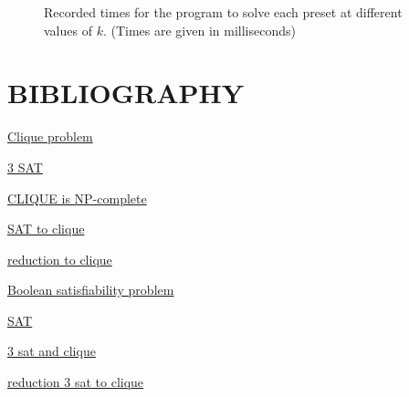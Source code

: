 \documentclass[table]{article}
\begin{document}
\begin{figure}[h]
\begin{subfigure}{0.49\linewidth}
    \end{subfigure}
    \caption{Recorded times for the program to solve each preset at different values of $k$. (Times are given in milliseconds)}
\end{figure}

\newpage\section{BIBLIOGRAPHY}

\leftskip=1.2in
\href{https://en.wikipedia.org/wiki/Clique_problem}{Clique problem}\newline

\leftskip=1in
\href{http://www.cs.ecu.edu/karl/6420/spr16/Notes/NPcomplete/3sat.html}{3 SAT}\newline

\href{https://www.geeksforgeeks.org/proof-that-clique-decision-problem-is-np-complete}{CLIQUE is NP-complete}\newline

\href{https://opendsa-server.cs.vt.edu/ODSA/Books/Everything/html/threeSAT_to_clique.html}{SAT to clique}\newline

\href{https://paperzz.com/doc/7301675/3sat-reduction-to-clique}{reduction to clique}\newline
 
\href{https://en.wikipedia.org/wiki/Boolean_satisfiability_problem}{Boolean satisfiability problem}\newline

\href{https://www.cs.umd.edu/~gasarch/TOPICS/sat/SATtalk.pdf}{SAT}\newline

\href{https://photolens.tech/reduction-3sat-and-clique/}{3 sat and clique}\newline

\href{https://cs.stackexchange.com/questions/70531/reduction-3sat-and-clique}{reduction 3 sat to clique}\newline
\end{document}
